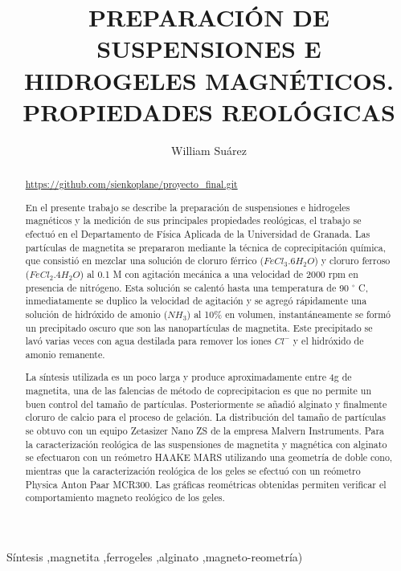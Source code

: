 \documentclass[review]{elsarticle}
\begin{document}
\begin{frontmatter}
\title{PREPARACI\'ON DE SUSPENSIONES E HIDROGELES MAGN\'ETICOS. PROPIEDADES REOL\'OGICAS}


\author[a]{William Su\'arez}
\address[a]{Afiliaci\'on X1.}



\begin{abstract}

\textcolor{cyan}{\underline{\url{https://github.com/sienkoplane/proyecto_final.git}}}

En el presente trabajo se describe la preparaci\'on de suspensiones e hidrogeles magn\'eticos y la medici\'on de sus principales propiedades reol\'ogicas, el trabajo se efectu\'o en el Departamento de F\'isica Aplicada de la Universidad de Granada. Las part\'iculas de magnetita se prepararon mediante la t\'ecnica de coprecipitaci\'on qu\'imica, que consisti\'o en mezclar una soluci\'on de cloruro f\'errico ($Fe Cl_{3} .6 H_{2}O$) y cloruro ferroso ($Fe Cl_{2} .4 H_{2}O$) al 0.1 M con agitaci\'on mec\'anica a una velocidad de 2000 rpm en presencia de nitr\'ogeno. Esta soluci\'on se calent\'o hasta una temperatura de 90 {\ensuremath{{}^\circ}} C, inmediatamente se duplico la velocidad de agitaci\'on y se agreg\'o r\'apidamente una soluci\'on de hidr\'oxido de amonio ($NH_3$) al 10\% en volumen, instant\'aneamente se form\'o un precipitado oscuro que son las nanopart\'iculas de magnetita.
Este precipitado se lav\'o varias veces con agua destilada para remover los iones $C l^{ -}$ y el hidr\'oxido de amonio remanente.

La s\'intesis utilizada es un poco larga y produce aproximadamente entre 4g de magnetita, una de las falencias de m\'etodo de coprecipitacion es que no permite un buen control del tama\~no de part\'iculas. Posteriormente se a\~nadi\'o alginato y finalmente cloruro de calcio para el proceso de gelaci\'on. La distribuci\'on del tama\~no de part\'iculas se obtuvo con un equipo Zetasizer Nano ZS de la empresa Malvern Instruments. Para la caracterizaci\'on reol\'ogica de las suspensiones de magnetita y magn\'etica con alginato se efectuaron con un re\'ometro HAAKE MARS utilizando una geometr\'ia de doble cono, mientras que la caracterizaci\'on reol\'ogica de los geles se efectu\'o con un re\'ometro Physica Anton Paar MCR300. Las gr\'aficas reom\'etricas obtenidas permiten verificar
el comportamiento magneto reol\'ogico de los geles.

\end{abstract}

\begin{keyword}
S\'intesis \sep magnetita \sep ferrogeles \sep alginato \sep magneto-reometr\'ia)
\end{keyword}

\end{frontmatter}
\end{document}
